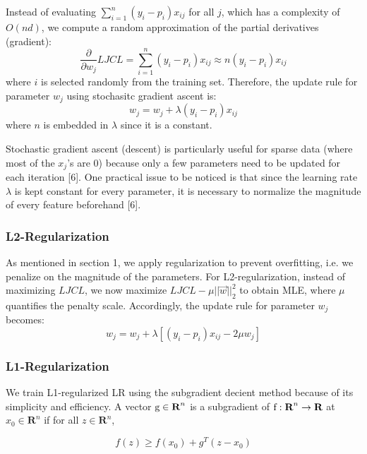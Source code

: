\documentclass{article} %
\begin{document}
Instead of evaluating $\sum\limits_{i=1}^n(y_i-p_i)x_{ij}$ for all $j$, which has a complexity of
$O(nd)$, we compute a random approximation of the partial derivatives (gradient):
\begin{equation}
  \frac{\partial}{\partial w_j} LJCL = \sum\limits_{i=1}^n(y_i-p_i)x_{ij} \approx n(y_i-p_i)x_{ij}
\end{equation}
where $i$ is selected randomly from the training set. Therefore, the update rule for parameter $w_j$ using stochasitc gradient ascent is:
\begin{equation}
  w_j = w_j + \lambda (y_i-p_i)x_{ij}
\end{equation}
where $n$ is embedded in $\lambda$ since it is a constant.

Stochastic gradient ascent (descent) is particularly useful for sparse data (where most of the $x_j$'s are 0) because only a few parameters need to be updated for each iteration [6]. One practical issue to be noticed is that since the learning rate $\lambda$ is kept constant for every parameter, it is necessary to normalize the magnitude of every feature beforehand [6].

\subsubsection{L2-Regularization}

As mentioned in section 1, we apply regularization to prevent overfitting, i.e. we penalize on the magnitude of the parameters. For L2-regularization, instead of maximizing $LJCL$, we now maximize $LJCL - \mu ||\vec{w}||_2^2$ to obtain MLE, where $\mu$ quantifies the penalty scale. Accordingly, the update rule for parameter $w_j$ becomes:
\begin{equation}
  w_j = w_j + \lambda [(y_i-p_i)x_{ij} - 2\mu w_j]
\end{equation}


\subsubsection{L1-Regularization}
We train L1-regularized LR using the subgradient decient method because of its simplicity and efficiency. A vector $\textup{g} \in \textbf{R}^n$ is a subgradient of $\textup{f}:\textbf{R}^n \rightarrow \textbf{R}$ at $x_0 \in \textbf{R}^n$ if for all $z \in \textbf{R}^n$,

\begin{equation}
f(z) \ge f(x_0) + g^T(z-x_0)
\end{equation}
\end{document}
